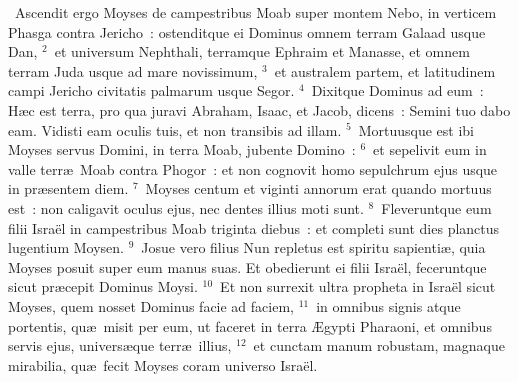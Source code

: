 ~\lettrine[lines=10,image=true,loversize=0.05,lraise=-0.03]{A}{}scendit ergo Moyses de campestribus Moab super montem Nebo, in verticem Phasga contra Jericho~: ostenditque ei Dominus omnem terram Galaad usque Dan,
${}^{2}$~et universum Nephthali, terramque Ephraim et Manasse, et omnem terram Juda usque ad mare novissimum,
${}^{3}$~et australem partem, et latitudinem campi Jericho civitatis palmarum usque Segor.
${}^{4}$~Dixitque Dominus ad eum~: H\ae c est terra, pro qua juravi Abraham, Isaac, et Jacob, dicens~: Semini tuo dabo eam. Vidisti eam oculis tuis, et non transibis ad illam.
${}^{5}$~Mortuusque est ibi Moyses servus Domini, in terra Moab, jubente Domino~:
${}^{6}$~et sepelivit eum in valle terr\ae\ Moab contra Phogor~: et non cognovit homo sepulchrum ejus usque in pr\ae sentem diem.
${}^{7}$~Moyses centum et viginti annorum erat quando mortuus est~: non caligavit oculus ejus, nec dentes illius moti sunt.
${}^{8}$~Fleveruntque eum filii Isra\"el in campestribus Moab triginta diebus~: et completi sunt dies planctus lugentium Moysen.
${}^{9}$~Josue vero filius Nun repletus est spiritu sapienti\ae , quia Moyses posuit super eum manus suas. Et obedierunt ei filii Isra\"el, feceruntque sicut pr\ae cepit Dominus Moysi.
${}^{10}$~Et non surrexit ultra propheta in Isra\"el sicut Moyses, quem nosset Dominus facie ad faciem,
${}^{11}$~in omnibus signis atque portentis, qu\ae\ misit per eum, ut faceret in terra \AE gypti Pharaoni, et omnibus servis ejus, univers\ae que terr\ae\ illius,
${}^{12}$~et cunctam manum robustam, magnaque mirabilia, qu\ae\ fecit Moyses coram universo Isra\"el.
